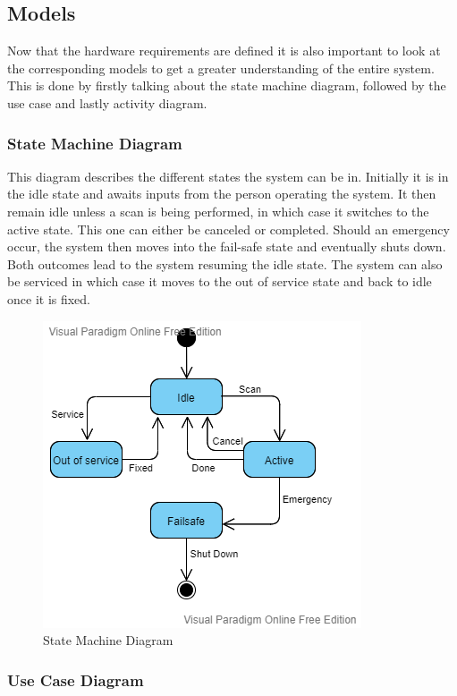 \documentclass[conference]{IEEEtran}
\begin{document}
    
    \subsection{Models}
    
    Now that the hardware requirements are defined it is also important to look at the corresponding models to get a greater understanding of the entire system. This is done by firstly talking about the state machine diagram, followed by the use case and lastly activity diagram.
    
    \subsubsection{State Machine Diagram}
    
    This diagram describes the different states the system can be in. Initially it is in the idle state and awaits inputs from the person operating the system. It then remain idle unless a scan is being performed, in which case it switches to the active state. This one can either be canceled or completed. Should an emergency occur, the system then moves into the fail-safe state and eventually shuts down. Both outcomes lead to the system resuming the idle state. The system can also be serviced in which case it moves to the out of service state and back to idle once it is fixed.
    
    \begin{figure}[htbp]
    \centerline{\includegraphics[scale = 0.62]{Pictures/statemachine.png}}
    \caption{State Machine Diagram}
    \label{statemachine}
    \end{figure}
    
    \subsubsection{Use Case Diagram}
    
\end{document}
